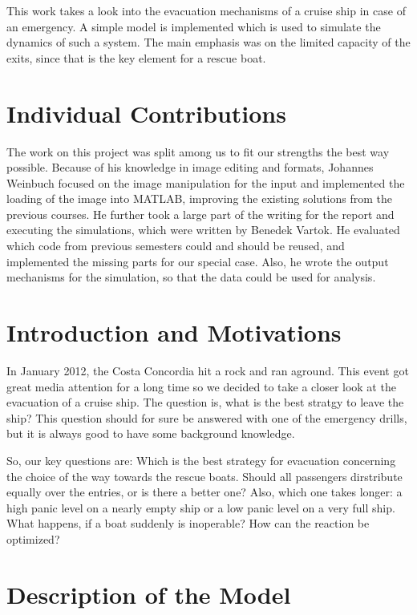 \documentclass[11pt]{article}
\begin{document}
This work takes a look into the evacuation mechanisms of a cruise ship in case
of an emergency.  A simple model is implemented which is used to simulate the
dynamics of such a system.  The main emphasis was on the limited capacity of
the exits, since that is the key element for a rescue boat. 


\section{Individual Contributions}

The work on this project was split among us to fit our strengths the best way
possible.  Because of his knowledge in image editing and formats, Johannes
Weinbuch focused on the image manipulation for the input and implemented the
loading of the image into MATLAB, improving the existing solutions from the
previous courses. He further took a large part of the writing for the report
and executing the simulations, which were written by Benedek Vartok.  He
evaluated which code from previous semesters could and should be reused, and
implemented the missing parts for our special case.  Also, he wrote the output
mechanisms for the simulation, so that the data could be used for analysis.


\section{Introduction and Motivations}

In January 2012, the Costa Concordia hit a rock and ran aground\cite{bbcnews}.
This event got great media attention for a long time so we decided to take a
closer look at the evacuation of a cruise ship.  The question is, what is the
best stratgy to leave the ship?  This question should for sure be answered with
one of the emergency drills, but it is always good to have some background
knowledge.

So, our key questions are: Which is the best strategy for evacuation concerning
the choice of the way towards the rescue boats. Should all passengers
dirstribute equally over the entries, or is there a better one? Also, which one
takes longer: a high panic level on a nearly empty ship or a low panic level on
a very full ship. What happens, if a boat suddenly is inoperable? How can the
reaction be optimized?


\section{Description of the Model}
\end{document}
